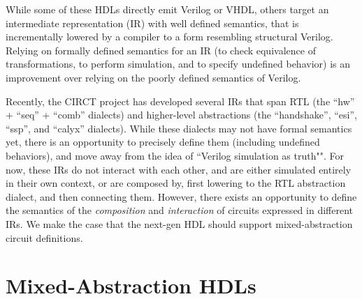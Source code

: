 \documentclass[sigplan,review,nonacm]{acmart}
\begin{document}

While some of these HDLs directly emit Verilog or VHDL, others target an intermediate representation (IR) with well defined semantics, that is incrementally lowered by a compiler to a form resembling structural Verilog.
Relying on formally defined semantics for an IR (to check equivalence of transformations, to perform simulation\cite{hwsemantics}, and to specify undefined behavior) is an improvement\cite{cider} over relying on the poorly defined semantics of Verilog.


Recently, the CIRCT project\cite{circt} has developed several IRs that span RTL (the ``hw'' + ``seq'' + ``comb'' dialects) and higher-level abstractions (the ``handshake'', ``esi'', ``ssp'', and ``calyx''\cite{calyx} dialects).
While these dialects may not have formal semantics yet, there is an opportunity to precisely define them (including undefined behaviors), and move away from the idea of ``Verilog simulation as truth"".
For now, these IRs do not interact with each other, and are either simulated entirely in their own context, or are composed by, first lowering to the RTL abstraction dialect, and then connecting them.
However, there exists an opportunity to define the semantics of the \textit{composition} and \textit{interaction} of circuits expressed in different IRs.
We make the case that the next-gen HDL should support mixed-abstraction circuit definitions.

\section{Mixed-Abstraction HDLs}

\end{document}
